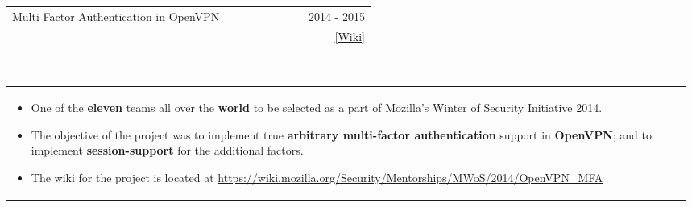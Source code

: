 \documentclass[a4paper]{article} %
\newcommand{\verticalspacing}{-0.25cm}
\newcommand{\bulletspace}{0.7cm}
\newcommand{\projectheadspacing}{6.9cm}
\newcommand{\cproject}[5]{%
    \begin{tabular}{p{0.60\linewidth}r}
        \textcolor{NavyBlue}{\small #2} & \multicolumn{1}{m{ \projectheadspacing{} }}{\raggedleft \small {\textsc{#1}}}\\
        \small {#3} & \small {#4}
    \end{tabular}\\
    \begin{tabular}{p{0.98\linewidth}}
    \vspace{-0.3cm}
        \small{#5}
    \end{tabular}
    \vspace{\verticalspacing{}}
}
\begin{document}
\cproject
    {2014 - 2015}
    {Multi Factor Authentication in OpenVPN}
    {\textsc{\raggedright Mozilla Winter of Security}, Guillaume Destuynder, Professor Dheeraj Sanghi}
    {\href{https://wiki.mozilla.org/Security/Mentorships/MWoS/2014/OpenVPN\_MFA} {[Wiki]} }
    {%
        \begin{itemize}[leftmargin=\bulletspace{}]
          \item One of the \textbf{eleven} teams all over the \textbf{world} to be selected as a part of Mozilla's Winter of Security Initiative 2014.
          \item The objective of the project was to implement true \textbf{arbitrary multi-factor authentication} support in
              \textbf{OpenVPN}; and to implement \textbf{session-support} for the additional factors.
          \item The wiki for the project is located at \href{https://wiki.mozilla.org/Security/Mentorships/MWoS/2014/OpenVPN\_MFA} {https://wiki.mozilla.org/Security/Mentorships/MWoS/2014/OpenVPN\_MFA}
      \end{itemize}
    }

\end{document}

